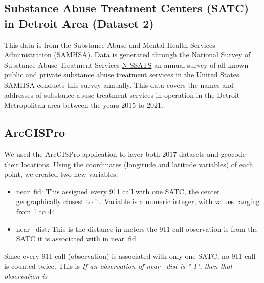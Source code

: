 \documentclass[12pt]{article}
\begin{document}
\subsection{Substance Abuse Treatment Centers (SATC) in Detroit Area (Dataset 2)}

This data is from the Substance Abuse and Mental Health Services Administration (SAMHSA). Data is generated through the National Survey of Substance Abuse Treatment Services \href{https://www.samhsa.gov/data/data-we-collect/n-ssats-national-survey-substance-abuse-treatment-services}{N-SSATS} an annual survey of all known public and private substance abuse treatment services in the United States. SAMHSA conducts this survey annually. This data covers the names and addresses of substance abuse treatment services in operation in the Detroit Metropolitan area between the years 2015 to 2021. 

\subsection{ArcGISPro}
We used the ArcGISPro application to layer both 2017 datasets and geocode their locations. Using the coordinates (longitude and latitude variables) of each point, we created two new variables:
\begin{itemize}
    \item near\textunderscore\ fid: This assigned every 911 call with one SATC, the center geographically closest to it. Variable is a numeric integer, with values ranging from 1 to 44. 
    \item near \textunderscore\ dist: This is the distance in meters the 911 call observation is from the SATC it is associated with in near\textunderscore\ fid. 
\end{itemize}
Since every 911 call (observation) is associated with only one SATC, no 911 call is counted twice. This is
\textit{If an observation of near \textunderscore\ dist is "-1", then that observation is} 
\end{document}

